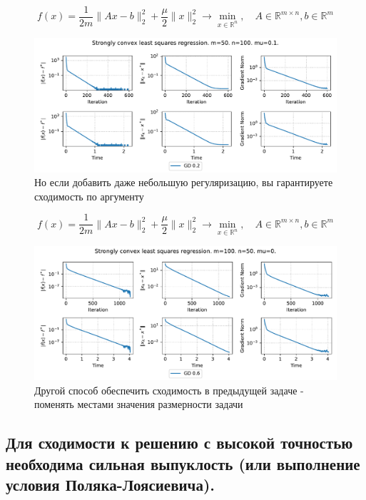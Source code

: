 \documentclass[
  russian,
  letterpaper,
  DIV=11,
  numbers=noendperiod]{scrartcl}
\begin{document}
\[
f(x) = \frac{1}{2m}\|A x - b\|^2_2 + \dfrac{\mu}{2} \|x\|^2_2\to \min_{x \in \mathbb{R}^{n}}, \quad A \in \mathbb{R}^{m \times n}, b \in \mathbb{R}^m
\]

\begin{figure}[H]

{\centering \includegraphics[width=0.85\linewidth,height=\textheight,keepaspectratio]{lls_convex_l2.pdf}

}

\caption{Но если добавить даже небольшую регуляризацию, вы гарантируете
сходимость по аргументу}

\end{figure}%

\[
f(x) = \frac{1}{2m}\|A x - b\|^2_2 + \dfrac{\mu}{2} \|x\|^2_2\to \min_{x \in \mathbb{R}^{n}}, \quad A \in \mathbb{R}^{m \times n}, b \in \mathbb{R}^m
\]

\begin{figure}[H]

{\centering \includegraphics[width=0.85\linewidth,height=\textheight,keepaspectratio]{lls_strongly_convex.pdf}

}

\caption{Другой способ обеспечить сходимость в предыдущей задаче -
поменять местами значения размерности задачи}

\end{figure}%

\subsection{Для сходимости к решению с высокой точностью необходима
сильная выпуклость (или выполнение условия
Поляка-Лоясиевича).}\label{ux434ux43bux44f-ux441ux445ux43eux434ux438ux43cux43eux441ux442ux438-ux43a-ux440ux435ux448ux435ux43dux438ux44e-ux441-ux432ux44bux441ux43eux43aux43eux439-ux442ux43eux447ux43dux43eux441ux442ux44cux44e-ux43dux435ux43eux431ux445ux43eux434ux438ux43cux430-ux441ux438ux43bux44cux43dux430ux44f-ux432ux44bux43fux443ux43aux43bux43eux441ux442ux44c-ux438ux43bux438-ux432ux44bux43fux43eux43bux43dux435ux43dux438ux435-ux443ux441ux43bux43eux432ux438ux44f-ux43fux43eux43bux44fux43aux430-ux43bux43eux44fux441ux438ux435ux432ux438ux447ux430.}
\end{document}
